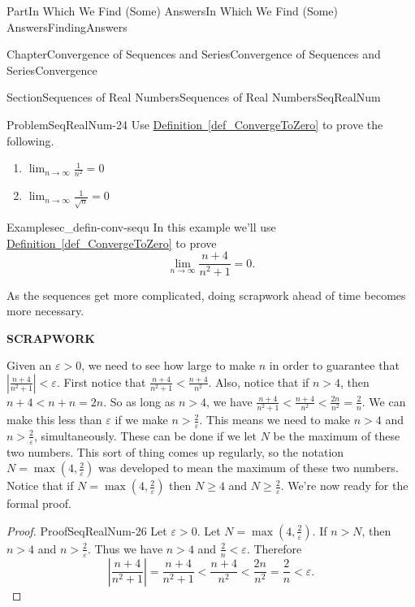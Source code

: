 \documentclass[oneside,10pt,]{book}
\newcommand{\xreffont}{\relax}
\newcommand{\terminology}[1]{\textbf{#1}}
\numberwithin{equation}{part}
\newcommand{\abs}[1]{\left|#1\right|}
\def\limit#1#2#3{{\displaystyle\lim_{#1\rightarrow #2}#3}}
\newcommand{\eps}{\varepsilon}
\newcommand{\lt}{<}
\begin{document}
\begin{partptx}{Part}{In Which We Find (Some) Answers}{}{In Which We Find (Some) Answers}{}{}{FindingAnswers}
\begin{chapterptx}{Chapter}{Convergence of Sequences and Series}{}{Convergence of Sequences and Series}{}{}{Convergence}
\begin{sectionptx}{Section}{Sequences of Real Numbers}{}{Sequences of Real Numbers}{}{}{SeqRealNum}
\begin{problem}{Problem}{}{SeqRealNum-24}%
Use \hyperref[def_ConvergeToZero]{Definition~{\xreffont\ref{def_ConvergeToZero}}}  to prove the following.%
\begin{enumerate}[font=\bfseries,label=(\alph*),ref=\alph*]%
\item{}\(\limit{n}{\infty}{\frac{1}{n^2}}=0\)%
\item{}\(\limit{n}{\infty}{\frac{1}{\sqrt{n}}}=0\)%
\end{enumerate}%
\end{problem}
\begin{example}{Example}{}{sec_defin-conv-sequ}%
In this example we'll  use \hyperref[def_ConvergeToZero]{Definition~{\xreffont\ref{def_ConvergeToZero}}} to prove%
\begin{equation*}
\limit{n}{\infty}{\frac{n+4}{n^2+1}}=0\text{.}
\end{equation*}
%
\par
As the sequences get more complicated, doing scrapwork ahead of time becomes more necessary.%
\par
\terminology{SCRAPWORK}%
\par
Given an \(\eps>0\), we need to see how large to make \(n\) in order to guarantee that \(|\frac{n+4}{n^2+1}|\lt \eps\). First notice that \(\frac{n+4}{n^2+1}\lt \frac{n+4}{n^2}\). Also, notice that if \(n>4\), then \(n+4\lt n+n=2n\). So as long as \(n>4\), we have \(\frac{n+4}{n^2+1}\lt \frac{n+4}{n^2}\lt \frac{2n}{n^2}=\frac{2}{n}\). We can make this less than \(\eps\) if we make \(n>\frac{2}{\eps}\). This means we need to make \(n>4\) and \(n>\frac{2}{\eps}\), simultaneously. These can be done if we let \(N\) be the maximum of these two numbers. This sort of thing comes up regularly, so the notation \(N=\max\left(4,\frac{2}{\eps}\right)\) was developed to mean the maximum of these two numbers. Notice that if \(N=\max\left(4, \frac{2}{\eps}\right)\) then \(N\geq 4\) and \(N\geq\frac{2}{\eps}\). We're now ready for the formal proof.%
\end{example}
\begin{proof}{Proof}{}{SeqRealNum-26}
Let \(\eps>0\). Let \(N=\max\left(4,\frac{2}{\eps}\right)\). If \(n>N\), then \(n>4\) and \(n>\frac{2}{\eps}\). Thus we have \(n>4\) and \(\frac{2}{n}\lt \eps\). Therefore%
\begin{equation*}
\abs{\frac{n+4}{n^2+1}}=\frac{n+4}{n^2+1}\lt \frac{n+4}{n^2}\lt \frac{2n}{n^2}= \frac{2}{n}\lt \eps\text{.}
\end{equation*}
%
\par

\end{proof}
\end{sectionptx}
\end{chapterptx}
\end{partptx}
\end{document}
